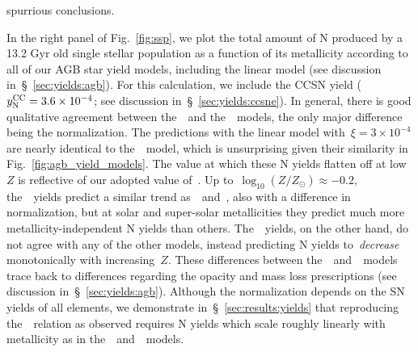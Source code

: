 \documentclass[ms.tex]{subfiles}
\begin{document}
spurrious conclusions.
\par
In the right panel of Fig.~\ref{fig:ssp}, we plot the total amount of N
produced by a 13.2 Gyr old single stellar population as a function of its
metallicity according to all of our AGB star yield models, including the linear
model (see discussion in~\S~\ref{sec:yields:agb}).
For this calculation, we include the CCSN yield ($y_\text{N}^\text{CC} = 3.6\times10^{-4}$;
see discussion in~\S~\ref{sec:yields:ccsne}).
In general, there is good qualitative agreement between the~\cristallo~and
the~\ventura~models, the only major difference being the normalization.
The predictions with the linear model with~$\xi = 3\times10^{-4}$ are nearly
identical to the~\cristallo~model, which is unsurprising given their
similarity in Fig.~\ref{fig:agb_yield_models}.
The value at which these N yields flatten off at low~$Z$ is reflective of our
adopted value of~.
Up to~$\log_{10}(Z / Z_\odot) \approx -0.2$, the~\karakas~yields predict a
similar trend as~\cristallo~and~\ventura, also with a difference in
normalization, but at solar and super-solar metallicities they predict much
more metallicity-independent N yields than others.
The~\karakasten~yields, on the other hand, do not agree with any of the other
models, instead predicting N yields to~\textit{decrease} monotonically with
increasing~$Z$.
These differences between the~\karakasten~and~\karakas~models trace back to
differences regarding the opacity and mass loss prescriptions (see discussion
in~\S~\ref{sec:yields:agb}).
Although the normalization depends on the SN yields of all elements, we
demonstrate in~\S~\ref{sec:results:yields} that reproducing the~\ohno~relation
as observed requires N yields which scale roughly linearly with metallicity as
in the~\cristallo~and~\ventura~models.
\end{document}
